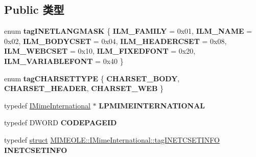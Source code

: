 \subsection*{Public 类型}
\begin{DoxyCompactItemize}
\item 
\mbox{\label{interface_m_i_m_e_o_l_e_1_1_i_mime_international_add8ece61c4d0cc5f0845efd83aa1e44a}} 
enum {\bfseries tag\+I\+N\+E\+T\+L\+A\+N\+G\+M\+A\+SK} \{ \newline
{\bfseries I\+L\+M\+\_\+\+F\+A\+M\+I\+LY} = 0x01, 
{\bfseries I\+L\+M\+\_\+\+N\+A\+ME} = 0x02, 
{\bfseries I\+L\+M\+\_\+\+B\+O\+D\+Y\+C\+S\+ET} = 0x04, 
{\bfseries I\+L\+M\+\_\+\+H\+E\+A\+D\+E\+R\+C\+S\+ET} = 0x08, 
\newline
{\bfseries I\+L\+M\+\_\+\+W\+E\+B\+C\+S\+ET} = 0x10, 
{\bfseries I\+L\+M\+\_\+\+F\+I\+X\+E\+D\+F\+O\+NT} = 0x20, 
{\bfseries I\+L\+M\+\_\+\+V\+A\+R\+I\+A\+B\+L\+E\+F\+O\+NT} = 0x40
 \}
\item 
\mbox{\label{interface_m_i_m_e_o_l_e_1_1_i_mime_international_ac5b50645ad89500369589bfa7063ffca}} 
enum {\bfseries tag\+C\+H\+A\+R\+S\+E\+T\+T\+Y\+PE} \{ {\bfseries C\+H\+A\+R\+S\+E\+T\+\_\+\+B\+O\+DY}, 
{\bfseries C\+H\+A\+R\+S\+E\+T\+\_\+\+H\+E\+A\+D\+ER}, 
{\bfseries C\+H\+A\+R\+S\+E\+T\+\_\+\+W\+EB}
 \}
\item 
\mbox{\label{interface_m_i_m_e_o_l_e_1_1_i_mime_international_a8e9ec698cdde8d5bd7de7fb25acecf9a}} 
typedef \hyperlink{interface_m_i_m_e_o_l_e_1_1_i_mime_international}{I\+Mime\+International} $\ast$ {\bfseries L\+P\+M\+I\+M\+E\+I\+N\+T\+E\+R\+N\+A\+T\+I\+O\+N\+AL}
\item 
\mbox{\label{interface_m_i_m_e_o_l_e_1_1_i_mime_international_a94e6dd1aa194d855e46faf5b5bacebb6}} 
typedef D\+W\+O\+RD {\bfseries C\+O\+D\+E\+P\+A\+G\+E\+ID}
\item 
\mbox{\label{interface_m_i_m_e_o_l_e_1_1_i_mime_international_a4f07a481ef28f6f7e90e640c0ed27c39}} 
typedef \hyperlink{interfacestruct}{struct} \hyperlink{struct_m_i_m_e_o_l_e_1_1_i_mime_international_1_1tag_i_n_e_t_c_s_e_t_i_n_f_o}{M\+I\+M\+E\+O\+L\+E\+::\+I\+Mime\+International\+::tag\+I\+N\+E\+T\+C\+S\+E\+T\+I\+N\+FO} {\bfseries I\+N\+E\+T\+C\+S\+E\+T\+I\+N\+FO}

\end{DoxyCompactItemize}
